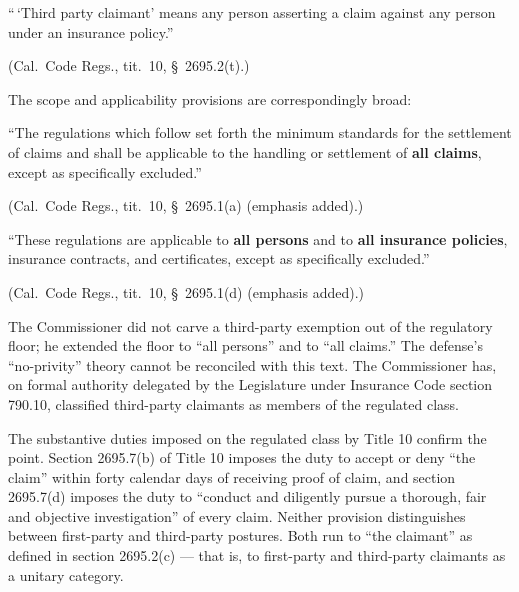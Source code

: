 \begin{quoting}
``\,`Third party claimant' means any person asserting a claim against any person under an insurance policy.''
\end{quoting}
\begin{flushright}
\small (Cal.\ Code Regs., tit.\ 10, \S~2695.2(t).)
\end{flushright}

\noindent The scope and applicability provisions are correspondingly broad:

\begin{quoting}
``The regulations which follow set forth the minimum standards for the settlement of claims and shall be applicable to the handling or settlement of \textbf{all claims}, except as specifically excluded.''
\end{quoting}
\begin{flushright}
\small (Cal.\ Code Regs., tit.\ 10, \S~2695.1(a) (emphasis added).)
\end{flushright}

\begin{quoting}
``These regulations are applicable to \textbf{all persons} and to \textbf{all insurance policies}, insurance contracts, and certificates, except as specifically excluded.''
\end{quoting}
\begin{flushright}
\small (Cal.\ Code Regs., tit.\ 10, \S~2695.1(d) (emphasis added).)
\end{flushright}

The Commissioner did not carve a third-party exemption out of the regulatory floor; he extended the floor to ``all persons'' and to ``all claims.'' The defense's ``no-privity'' theory cannot be reconciled with this text. The Commissioner has, on formal authority delegated by the Legislature under Insurance Code section 790.10, classified third-party claimants as members of the regulated class.

The substantive duties imposed on the regulated class by Title 10 confirm the point. Section 2695.7(b) of Title 10 imposes the duty to accept or deny ``the claim'' within forty calendar days of receiving proof of claim, and section 2695.7(d) imposes the duty to ``conduct and diligently pursue a thorough, fair and objective investigation'' of every claim. Neither provision distinguishes between first-party and third-party postures. Both run to ``the claimant'' as defined in section 2695.2(c) --- that is, to first-party and third-party claimants as a unitary category.

